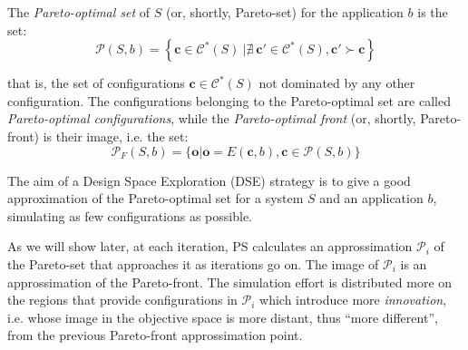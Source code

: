 \begin{definition}
The {\em Pareto-optimal set} of $S$ (or, shortly, Pareto-set) for the application $b$ is the
set:
\[ \mathcal{P}(S,b) = \left\{ \mathbf{c} \in \mathcal{C}^*(S) \ | \nexists \ \mathbf{c}' \in \mathcal{C}^*(S), \mathbf{c}' \succ \mathbf{c} \right\} \]
\end{definition}
that is, the set of configurations $\mathbf{c} \in
\mathcal{C}^*(S)$ not dominated by any other configuration.
The configurations belonging to the Pareto-optimal set are called \emph{Pareto-optimal configurations}, while the {\em Pareto-optimal front} (or, shortly, Pareto-front) is their image, i.e. the set:
\[ \mathcal{P}_{F}(S,b) = \{ \mathbf{o} | \mathbf{o} = E(\mathbf{c},b), \mathbf{c} \in \mathcal{P}(S,b) \} \]

The aim of a Design Space Exploration (DSE) strategy is to give a
good approximation of the Pareto-optimal set for a system $S$ and an
application $b$, simulating as few configurations as possible.


As we will show later, at each iteration, PS calculates an approssimation $\mathscr{P}_i$ of the Pareto-set that approaches it as iterations go on. The image of $\mathscr{P}_i$ is an approssimation of the Pareto-front.
The simulation effort is distributed more on the regions that provide configurations in $\mathscr{P}_i$ which introduce more \emph{innovation}, i.e. whose image in the objective space is more distant, thus ``more different'', from the previous Pareto-front approssimation point.





